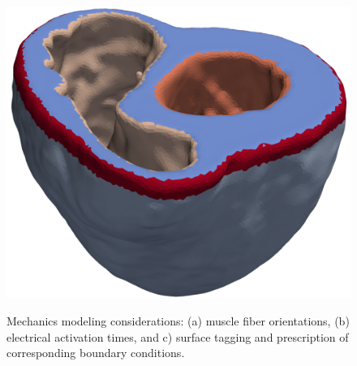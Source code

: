 \begin{figure}[ht]
{		\includegraphics[scale=0.088]{media/4-cardioid/4-tagged.png}
\label{fig:supp3}}
%
\caption{Mechanics modeling considerations: (a) muscle fiber orientations, (b) electrical activation times, and c) surface tagging and prescription of corresponding boundary conditions.}
\label{fig:supp}
\end{figure}

